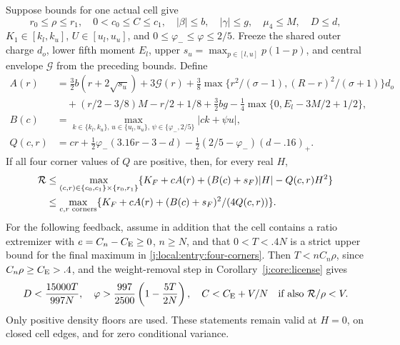 \begin{lemma}\label{j:local:entry:cell-theorem}\label{j:local:entry:corners}
Suppose bounds for one actual cell give
\[
 r_0\le\rho\le r_1,\quad0<c_0\le C\le c_1,\quad
 |\beta|\le b,\quad |\gamma|\le g,\quad \mu_4\le M,\quad D\le d,
\]
$K_1\in[k_l,k_u]$, $U\in[u_l,u_u]$, and
$0\le\varphi_-\le\varphi\le2/5$. Freeze the shared outer charge $d_o$,
lower fifth moment $E_l$, upper $s_u=\max_{p\in[l,u]}p(1-p)$, and
central envelope $\mathcal G$ from the preceding bounds.
Define
\begin{align*}
 A(r)&=\tfrac32 b(r+2\sqrt{s_u})+3\mathcal G(r)
 +\tfrac38\max\{r^2/(\sigma-1),(R-r)^2/(\sigma+1)\}d_o\\
 &\quad +(r/2-3/8)M-r/2+1/8+\tfrac32bg
 -\tfrac14\max\{0,E_l-3M/2+1/2\},\\
 B(c)&=\max_{k\in\{k_l,k_u\},\,u\in\{u_l,u_u\},\,
                      \psi\in\{\varphi_-,2/5\}}|ck+\psi u|,\\
 Q(c,r)&=cr+\tfrac12\varphi_-(3.16r-3-d)
       -\tfrac12(2/5-\varphi_-)(d-.16)_+.
\end{align*}
If all four corner values of $Q$ are positive, then, for every real $H$,
\begin{align}
 \mathcal R&\le\max_{(c,r)\in\{c_0,c_1\}\times\{r_0,r_1\}}
       \{K_F+cA(r)+(B(c)+s_F)|H|-Q(c,r)H^2\}\notag\\
 &\le\max_{c,r\text{ corners}}
       \{K_F+cA(r)+(B(c)+s_F)^2/(4Q(c,r))\}.           \label{j:local:entry:four-corners}
\end{align}
For the following feedback, assume in addition that the cell contains a
ratio extremizer with $e=C_n-C_{\mathrm E}\ge0$, $n\ge N$, and that
$0<T<.4N$ is a strict upper bound for the final maximum in
\eqref{j:local:entry:four-corners}. Then $T<nC_n\rho$, since
$C_n\rho\ge C_{\mathrm E}>.4$, and the weight-removal step in
Corollary~\ref{j:core:license} gives
\begin{equation}\label{j:local:entry:feedback-values}
 D<\frac{15000T}{997N},\quad
 \varphi>\frac{997}{2500}\left(1-\frac{5T}{2N}\right),\quad
 C<C_{\mathrm E}+V/N\quad\text{if also }\mathcal R/\rho<V.
\end{equation}
Only positive density floors are used. These statements remain valid at
$H=0$, on closed cell edges, and for zero conditional variance.
\end{lemma}
